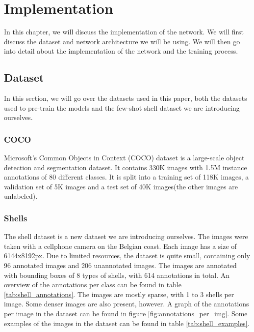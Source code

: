  
\chapter{Implementation}
In this chapter, we will discuss the implementation of the network. We will first discuss the dataset and network architecture we will be using. We will then go into detail about the implementation of the network and the training process. 

\section{Dataset}
In this section, we will go over the datasets used in this paper, both the datasets used to pre-train the models and the few-shot shell dataset we are introducing ourselves.

\subsection{COCO}

Microsoft's Common Objects in Context (COCO) dataset is a large-scale object detection and segmentation dataset. It contains 330K images with 1.5M instance annotations of 80 different classes. It is split into a training set of 118K images, a validation set of 5K images and a test set of 40K images(the other images are unlabeled). \citet{COCO}

\subsection{Shells}

The shell dataset is a new dataset we are introducing ourselves. The images were taken with a cellphone camera on the Belgian coast. Each image has a size of 6144x8192px. Due to limited resources, the dataset is quite small, containing only 96 annotated images and 206 unannotated images. The images are annotated with bounding boxes of 8 types of shells, with 614 annotations in total. An overview of the annotations per class can be found in table \ref{tab:shell_annotations}. The images are mostly sparse, with 1 to 3 shells per image. Some denser images are also present, however. A graph of the annotations per image in the dataset can be found in figure \ref{fig:annotations_per_img}. Some examples of the images in the dataset can be found in table \ref{tab:shell_examples}.

